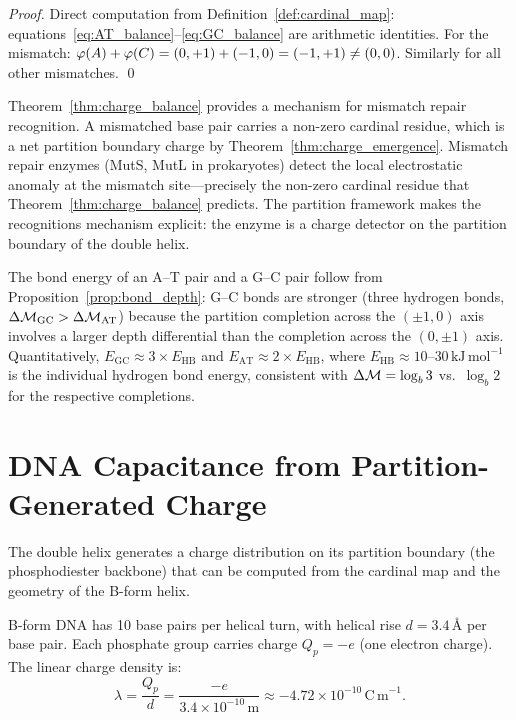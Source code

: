 \begin{proof}
Direct computation from Definition~\ref{def:cardinal_map}:
equations~\eqref{eq:AT_balance}--\eqref{eq:GC_balance} are arithmetic
identities. For the mismatch: $\varphi(A) + \varphi(C) = (0,+1) + (-1,0) = (-1,+1) \neq (0,0)$.
Similarly for all other mismatches. \qed
\end{proof}

\begin{remark}
Theorem~\ref{thm:charge_balance} provides a mechanism for mismatch repair
recognition. A mismatched base pair carries a non-zero cardinal residue,
which is a net partition boundary charge by Theorem~\ref{thm:charge_emergence}.
Mismatch repair enzymes (MutS, MutL in prokaryotes) detect the local
electrostatic anomaly at the mismatch site---precisely the non-zero cardinal
residue that Theorem~\ref{thm:charge_balance} predicts. The partition framework
makes the recognitions mechanism explicit: the enzyme is a charge detector
on the partition boundary of the double helix.
\end{remark}

The bond energy of an A--T pair and a G--C pair follow from
Proposition~\ref{prop:bond_depth}: G--C bonds are stronger (three hydrogen
bonds, $\Delta\mathcal{M}_{\mathrm{GC}} > \Delta\mathcal{M}_{\mathrm{AT}}$) because the
partition completion across the $(\pm 1, 0)$ axis involves a larger depth
differential than the completion across the $(0, \pm 1)$ axis. Quantitatively,
$E_{\mathrm{GC}} \approx 3 \times E_{\mathrm{HB}}$ and
$E_{\mathrm{AT}} \approx 2 \times E_{\mathrm{HB}}$, where $E_{\mathrm{HB}} \approx 10$--$30\,\mathrm{kJ\,mol}^{-1}$
is the individual hydrogen bond energy, consistent with $\Delta\mathcal{M} = \log_b 3$
vs.\ $\log_b 2$ for the respective completions.

\section{DNA Capacitance from Partition-Generated Charge}
\label{sec:dna_capacitance}

The double helix generates a charge distribution on its partition boundary
(the phosphodiester backbone) that can be computed from the cardinal map
and the geometry of the B-form helix.

\begin{proposition}
\label{prop:dna_charge_density}
B-form DNA has 10 base pairs per helical turn, with helical rise $d = 3.4\,\text{\AA}$
per base pair. Each phosphate group carries charge $Q_p = -e$ (one electron charge).
The linear charge density is:
\begin{equation}
  \lambda = \frac{Q_p}{d} = \frac{-e}{3.4 \times 10^{-10}\,\mathrm{m}}
           \approx -4.72 \times 10^{-10}\,\mathrm{C\,m}^{-1}.
  \label{eq:lambda_dna}
\end{equation}
\end{proposition}

